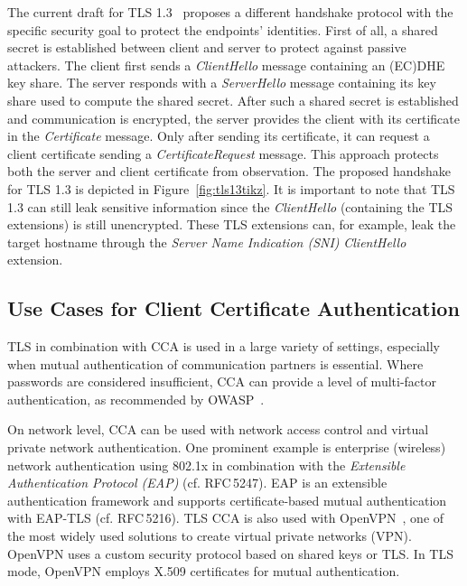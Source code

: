 The current draft for TLS 1.3~\cite{ietf-tls-rfc5246-bis-16} proposes a
different handshake protocol with the specific security goal to protect the
endpoints' identities. First of all, a shared secret is established between
client and server to protect against passive attackers. The client first sends a
\textit{ClientHello} message containing an (EC)DHE key share. The server
responds with a \textit{ServerHello} message containing its key share used to
compute the shared secret. After such a shared secret is established and
communication is encrypted, the server provides the client with its certificate
in the \textit{Certificate} message. Only after sending its certificate, it can
request a client certificate sending a \textit{CertificateRequest} message.
This approach protects both the server and client certificate from observation. 
The proposed handshake for TLS 1.3 is depicted in Figure~\ref{fig:tls13tikz}.
It is important to note that TLS 1.3 can still leak sensitive information since the \textit{ClientHello} (containing the TLS extensions) is still unencrypted. 
These TLS extensions can, for example, leak the target hostname through the \textit{Server Name Indication (SNI)} \textit{ClientHello} extension.



\subsection{Use Cases for Client Certificate Authentication}

TLS in combination with CCA is used in a large
variety of settings, especially when mutual authentication of communication
partners is essential. 
Where passwords are considered insufficient, CCA can provide a level of multi-factor authentication, as recommended by OWASP~\cite{OwaspCCA}.

On network level, CCA can be used with network access control and virtual private
network authentication. One prominent example is enterprise (wireless) network
authentication using 802.1x in combination with the \emph{Extensible Authentication
Protocol (EAP)} (cf. RFC\,5247). EAP is an extensible authentication framework
and supports certificate-based mutual authentication with EAP-TLS (cf. RFC\,5216).
TLS CCA is also used with OpenVPN~\cite{OpenVpn}, one of the most widely used solutions
to create virtual private networks (VPN). OpenVPN uses a custom security
protocol based on shared keys or TLS. In TLS mode, OpenVPN employs X.509
certificates for mutual authentication.

